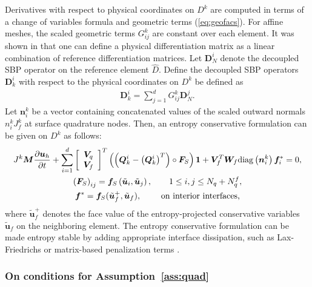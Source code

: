 \documentclass[review]{siamart0216}
\theoremstyle{assumption}
\renewcommand{\hat}[1]{\hat{#1}}
\newcommand{\pd}[2]{\frac{\partial#1}{\partial#2}}
\newcommand{\LRp}[1]{\left( #1 \right)}
\newcommand{\LRs}[1]{\left[ #1 \right]}
\renewcommand{\hat}{\widehat}
\newcommand{\diag}[1]{{\rm diag}\LRp{#1}}
\begin{document}
Derivatives with respect to physical coordinates on $D^k$ are computed in terms of a change of variables formula and geometric terms (\ref{eq:geofacs}).  For affine meshes, the scaled geometric terms ${G}^k_{ij}$ are constant over each element.  It was shown in \cite{chan2017discretely} that one can define a physical differentiation matrix as a linear combination of reference differentiation matrices.  Let ${\bm{D}}^i_N$ denote the decoupled SBP operator on the reference element $\hat{D}$.  Define the decoupled SBP operators $\bm{D}^i_k$ with respect to the physical coordinates on $D^k$ be defined as
\begin{align}
{\bm{D}}^i_k = \sum_{j=1}^d {G}^k_{ij}{\bm{D}}^j_N.
\end{align}
Let $\bm{n}^k_i$ be a vector containing concatenated values of the scaled outward normals $n^k_iJ^k_f$ at surface quadrature nodes.  
Then, an entropy conservative formulation can be given on $D^k$ as follows:
\begin{gather}
J^k\bm{M}\pd{\bm{u}_h}{t} + 
\sum_{i=1}^d \LRs{\begin{array}{cc}
\bm{V}_q \\
\bm{V}_f\end{array}}^T \LRp{\LRp{\bm{Q}^i_k - \LRp{\bm{Q}^i_k}^T} \circ \bm{F}_S}\bm{1} + \bm{V}_f^T\bm{W}_f \diag{{\bm{n}^k_i}}\bm{f}_i^* = 0, \label{eq:skewform}\\
\LRp{\bm{F}_S}_{ij} = \bm{f}_S\LRp{\tilde{\bm{u}}_i,\tilde{\bm{u}}_j}, \qquad 1\leq i,j\leq N_q + N^f_q, \nonumber\\
\bm{f}^* = \bm{f}_S(\tilde{\bm{u}}_f^+,\tilde{\bm{u}}_f), \qquad \text{ on interior interfaces,} \nonumber
\end{gather}
where $\tilde{\bm{u}}_f^+$ denotes the face value of the entropy-projected conservative variables $\tilde{\bm{u}}_f$ on the neighboring element.  The entropy conservative formulation can be made entropy stable by adding appropriate interface dissipation, such as Lax-Friedrichs or matrix-based penalization terms \cite{winters2017uniquely, chen2017entropy, chan2017discretely}.  

\subsubsection{On conditions for Assumption~\ref{ass:quad}}
\end{document}
